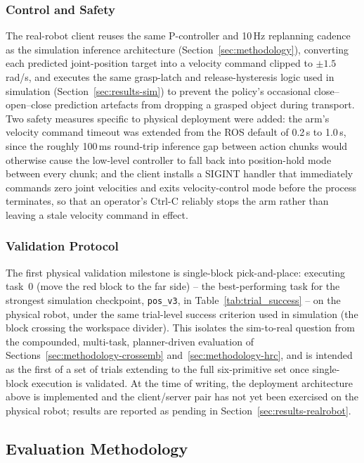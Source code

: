 \documentclass[12pt]{article}
\begin{document}
\subsubsection{Control and Safety}
The real-robot client reuses the same P-controller and 10\,Hz replanning cadence as the simulation inference architecture (Section~\ref{sec:methodology}), converting each predicted joint-position target into a velocity command clipped to $\pm 1.5$\,rad/s, and executes the same grasp-latch and release-hysteresis logic used in simulation (Section~\ref{sec:results-sim}) to prevent the policy's occasional close--open--close prediction artefacts from dropping a grasped object during transport. Two safety measures specific to physical deployment were added: the arm's velocity command timeout was extended from the ROS default of 0.2\,s to 1.0\,s, since the roughly 100\,ms round-trip inference gap between action chunks would otherwise cause the low-level controller to fall back into position-hold mode between every chunk; and the client installs a SIGINT handler that immediately commands zero joint velocities and exits velocity-control mode before the process terminates, so that an operator's Ctrl-C reliably stops the arm rather than leaving a stale velocity command in effect.

\subsubsection{Validation Protocol}
The first physical validation milestone is single-block pick-and-place: executing task~0 (move the red block to the far side) -- the best-performing task for the strongest simulation checkpoint, \texttt{pos\_v3}, in Table~\ref{tab:trial_success} -- on the physical robot, under the same trial-level success criterion used in simulation (the block crossing the workspace divider). This isolates the sim-to-real question from the compounded, multi-task, planner-driven evaluation of Sections~\ref{sec:methodology-crossemb} and~\ref{sec:methodology-hrc}, and is intended as the first of a set of trials extending to the full six-primitive set once single-block execution is validated. At the time of writing, the deployment architecture above is implemented and the client/server pair has not yet been exercised on the physical robot; results are reported as pending in Section~\ref{sec:results-realrobot}.

\subsection{Evaluation Methodology}
\end{document}
